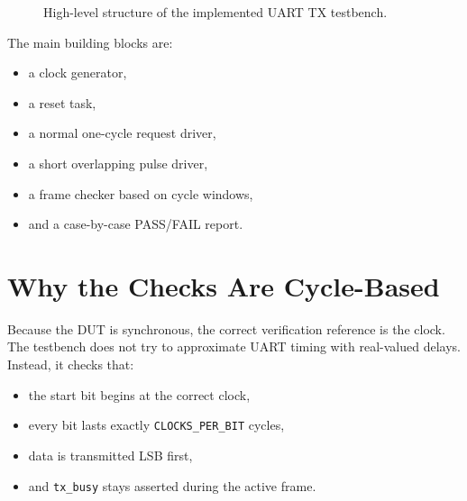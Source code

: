 \documentclass[12pt]{article}
\begin{document}
\begin{figure}[h!]
\centering
{}
\caption{High-level structure of the implemented UART TX testbench.}
\end{figure}

The main building blocks are:

\begin{itemize}
    \item a clock generator,
    \item a reset task,
    \item a normal one-cycle request driver,
    \item a short overlapping pulse driver,
    \item a frame checker based on cycle windows,
    \item and a case-by-case PASS/FAIL report.
\end{itemize}

\section{Why the Checks Are Cycle-Based}

Because the DUT is synchronous, the correct verification reference is the clock.
The testbench does not try to approximate UART timing with real-valued delays.
Instead, it checks that:

\begin{itemize}
    \item the start bit begins at the correct clock,
    \item every bit lasts exactly \texttt{CLOCKS\_PER\_BIT} cycles,
    \item data is transmitted LSB first,
    \item and \texttt{tx\_busy} stays asserted during the active frame.
\end{itemize}
\end{document}
